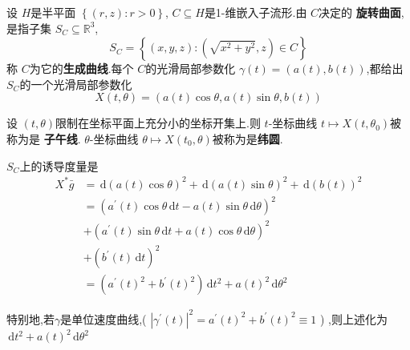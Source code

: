 \documentclass[../../几何与拓扑.tex]{subfiles}
\begin{document}
\begin{example}[旋转曲面]
    设 \(  H  \)是半平面 \(  \left\{ \left( r,z \right): r> 0  \right\}  \), \(  C\subseteq H  \)是1-维嵌入子流形.由 \(  C  \)决定的 \textbf{旋转曲面},是指子集 \(  S_{C}\subseteq \mathbb{R} ^{3}  \), \[
    S_{C} =  \left\{ \left( x,y,z \right): \left( \sqrt{x^{2}+ y^{2}},z \right) \in C   \right\}
    \]     称 \(  C  \)为它的\textbf{生成曲线}.每个 \(  C  \)的光滑局部参数化 \(   \gamma \left( t \right)= \left( a\left( t \right),b\left( t \right)   \right)    \),都给出 \(  S_{C}  \)的一个光滑局部参数化 \[
    X\left( t, \theta  \right)= \left( a\left( t \right)\cos  \theta ,a\left( t \right)\sin  \theta ,b\left( t \right)    \right)  
    \]    

    设 \(  \left( t, \theta  \right)   \)限制在坐标平面上充分小的坐标开集上.则 \(  t  \)-坐标曲线 \(  t\mapsto X\left( t, \theta _0  \right)   \)被称为是 \textbf{子午线}. \(   \theta   \)-坐标曲线 \(   \theta \mapsto X\left( t_0, \theta  \right)   \)被称为是\textbf{纬圆}.
    
    \(  S_{C}  \)上的诱导度量是  \[
    \begin{aligned}
    X^{*}\bar{g}&= \,\mathrm{d} \left( a\left( t \right)\cos  \theta   \right)^{2} + \,\mathrm{d} \left( a\left( t \right)\sin  \theta   \right)   ^{2}+ \,\mathrm{d} \left( b\left( t \right)  \right)^{2}\\ 
     &=  \left( a^{\prime} \left( t \right)\cos  \theta \,\mathrm{d} t-a\left( t \right)\sin  \theta \,\mathrm{d}  \theta    \right)^{2}\\ 
      & +  \left( a^{\prime} \left( t \right)\sin  \theta \,\mathrm{d} t+ a\left( t \right)\cos  \theta \,\mathrm{d}  \theta    \right)^{2}\\ 
       & + \left( b^{\prime} \left( t \right)\,\mathrm{d} t  \right)   ^{2}\\ 
        &=  \left( a^{\prime} \left( t \right)^{2}+ b^{\prime} \left( t \right)^{2}   \right)\,\mathrm{d} t^{2}+ a\left( t \right)^{2}\,\mathrm{d}  \theta ^{2}  
    \end{aligned}
    \]


    特别地,若\(  \gamma   \)是单位速度曲线,( \(  \left|  \gamma ^{\prime} \left( t \right)  \right|^{2}= a^{\prime} \left( t \right)^{2}+ b^{\prime} \left( t \right)^{2}\equiv 1     \) ) ,则上述化为 \(  \,\mathrm{d} t^{2}+ a\left( t \right)^{2}\,\mathrm{d}  \theta ^{2}   \) 
\end{example}

\hspace*{\fill} 
\end{document}

